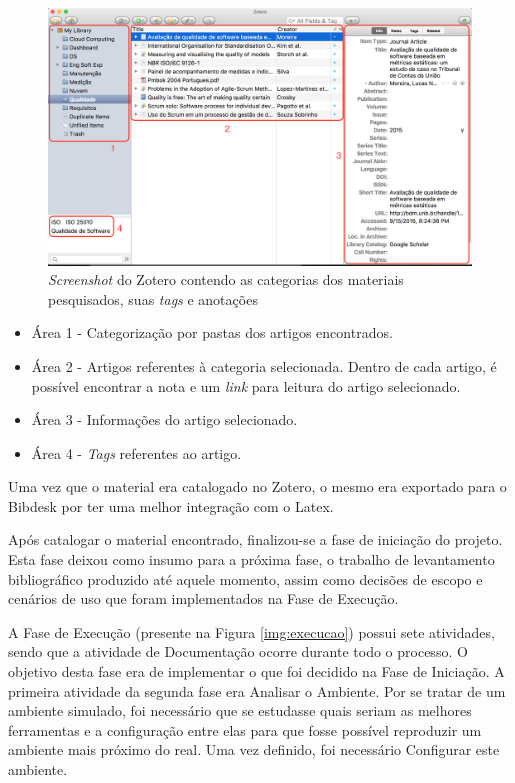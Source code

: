 \graphicspath{{figuras/}}
\begin{figure}[H]
\centering
\includegraphics[scale=0.30]{zotero_edit2.png}
\caption{\textit{Screenshot} do Zotero contendo as categorias dos materiais pesquisados, suas \textit{tags} e anotações}
\label{img:zotero}
\end{figure}

\begin{itemize}
\item Área 1 - Categorização por pastas dos artigos encontrados.
\item Área 2 - Artigos referentes à categoria selecionada. Dentro de cada artigo, é possível encontrar a nota e um \textit{link} para leitura do artigo selecionado.
\item Área 3 - Informações do artigo selecionado.
\item Área 4 - \textit{Tags} referentes ao artigo.
\end{itemize}
Uma vez que o material era catalogado no Zotero, o mesmo era exportado para o Bibdesk por ter uma melhor integração com o Latex.

Após catalogar o material encontrado, finalizou-se a fase de iniciação do projeto. Esta fase deixou como insumo para a próxima fase, o trabalho de levantamento bibliográfico produzido até aquele momento, assim como decisões de escopo e cenários de uso que foram implementados na Fase de Execução. 

A Fase de Execução (presente na Figura \ref{img:execucao}) possui sete atividades, sendo que a atividade de Documentação ocorre durante todo o processo. O objetivo desta fase era de implementar o que foi decidido na Fase de Iniciação. A primeira atividade da segunda fase era Analisar o Ambiente. Por se tratar de um ambiente simulado, foi necessário que se estudasse quais seriam as melhores ferramentas e a configuração entre elas para que fosse  possível reproduzir um ambiente mais próximo do real. Uma vez definido, foi necessário Configurar este ambiente.

